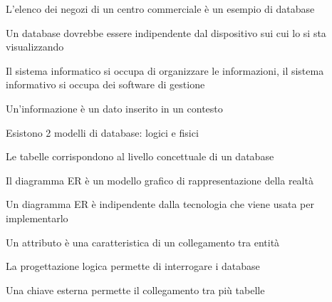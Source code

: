 \documentclass[addpoints]{exam}
\newcommand{\tf}[1][{}]{%
	\fillin[#1][0.25in]%
}
\begin{document}
\begin{multicols}{2}
\begin{questions}
\question[1] \tf[T] L'elenco dei negozi di un centro commerciale è un esempio di database

\question[1] \tf[T] Un database dovrebbe essere indipendente dal dispositivo sui cui lo si sta visualizzando

\question[1] \tf[F] Il sistema informatico si occupa di organizzare le informazioni, il sistema informativo si occupa dei software di gestione

\question[1] \tf[T] Un'informazione è un dato inserito in un contesto

\question[1] \tf[F] Esistono 2 modelli di database: logici e fisici

\question[1] \tf[F] Le tabelle corrispondono al livello concettuale di un database

\question[1] \tf[T] Il diagramma ER è un modello grafico di rappresentazione della realtà

\question[1] \tf[T] Un diagramma ER è indipendente dalla tecnologia che viene usata per implementarlo

\question[1] \tf[F] Un attributo è una caratteristica di un collegamento tra entità

\question[1] \tf[F] La progettazione logica permette di interrogare i database

\question[1] \tf[T] Una chiave esterna permette il collegamento tra più tabelle

\end{questions}
\end{multicols}
\end{document}
